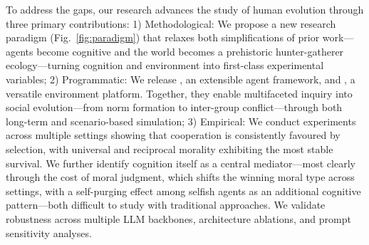 To address the gaps, our research advances the study of human evolution through three primary contributions:
1) Methodological: We propose a new research paradigm (Fig.~\ref{fig:paradigm}) that relaxes both simplifications of prior work---agents become cognitive and the world becomes a prehistoric hunter-gatherer ecology---turning cognition and environment into first-class experimental variables;
2) Programmatic: We release \agentframe, an extensible agent framework, and \envframe, a versatile environment platform. Together, they enable multifaceted inquiry into social evolution—from norm formation to inter-group conflict—through both long-term and scenario-based simulation;
3) Empirical: We conduct experiments across multiple settings showing that cooperation is consistently favoured by selection, with universal and reciprocal morality exhibiting the most stable survival. We further identify cognition itself as a central mediator---most clearly through the cost of moral judgment, which shifts the winning moral type across settings, with a self-purging effect among selfish agents as an additional cognitive pattern---both difficult to study with traditional approaches. We validate robustness across multiple LLM backbones, architecture ablations, and prompt sensitivity analyses.

